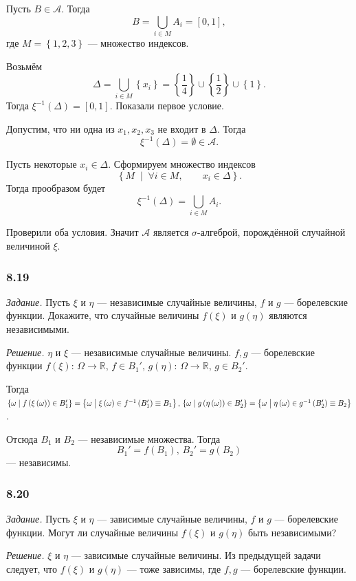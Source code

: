 \begin{enumerate}[label=\alph*)]
Пусть $B \in \mathcal{A} $.
Тогда
$$B =
\bigcup \limits_{i \in M} A_i =
\left[0, 1 \right],$$
где $M = \left\{ 1, 2, 3 \right\} $ --- множество индексов.

Возьмём
$$ \Delta =
\bigcup \limits_{i \in M} \left\{ x_i \right\} =
\left\{ \frac{1}{4} \right\} \cup \left\{ \frac{1}{2} \right\} \cup \left\{ 1 \right\}.$$
Тогда $ \xi^{-1} \left( \Delta \right) =\left[ 0, 1 \right] $.
Показали первое условие.

Допустим, что ни одна из $x_1, x_2, x_3$ не входит в $ \Delta $.
Тогда
$$ \xi^{-1} \left( \Delta \right) =
\emptyset \in
\mathcal{A}.$$

Пусть некоторые $x_i \in \Delta $.
Сформируем множество индексов
$$ \left\{ M \; \middle| \; \forall i \in M, \qquad x_i \in \Delta \right\}.$$
Тогда прообразом будет
$$ \xi^{-1} \left( \Delta \right) =
\bigcup \limits_{i \in M} A_i.$$

Проверили оба условия.
Значит $ \mathcal{A} $ является $ \sigma $-алгеброй, порождённой случайной величиной $ \xi $.
\end{enumerate}

\subsubsection*{8.19}

\textit{Задание.} Пусть $ \xi $ и $ \eta $ --- независимые случайные величины, $f$ и $g$ --- борелевские функции.
Докажите, что случайные величины $f \left( \xi \right) $ и $g \left( \eta \right) $ являются независимыми.

\textit{Решение.} $ \eta $ и $ \xi $ --- независимые случайные величины.
$f, g$ ---
борелевские функции
$f \left( \xi \right): \, \Omega \rightarrow \mathbb{R}, \,
f \in B_1', \,
g \left( \eta \right): \, \Omega \rightarrow \mathbb{R}, \,
g \in B_2'$.

Тогда
$ \left\{ \omega \; \middle| \; f \left( \xi \left( \omega \right) \right) \in B_1' \right\} =
\left\{ \omega \; \middle| \; \xi \left( \omega \right) \in f^{-1} \left( B_1' \right) \equiv B_1 \right\}, \, \\
\left\{ \omega \; \middle| \; g \left( \eta \left( \omega \right) \right) \in B_2' \right\} =
\left\{ \omega \; \middle| \; \eta \left( \omega \right) \in g^{-1} \left( B_2' \right) \equiv B_2 \right\} $.

Отсюда $B_1$ и $B_2$ --- независимые множества.
Тогда
$$B_1' = f \left( B_1 \right), \,
B_2' = g \left( B_2 \right) $$
--- независимы.

\subsubsection*{8.20}

\textit{Задание.} Пусть $ \xi $ и $ \eta $ --- зависимые случайные величины, $f$ и $g$ --- борелевские функции.
Могут ли случайные величины $f \left( \xi \right) $ и $g \left( \eta \right) $ быть независимыми?

\textit{Решение.} $ \xi $ и $ \eta $ --- зависимые случайные величины.
Из предыдущей задачи следует, что $f \left( \xi \right) $ и $g \left( \eta \right) $ --- тоже зависимы, где $f, g$ --- борелевские функции.
